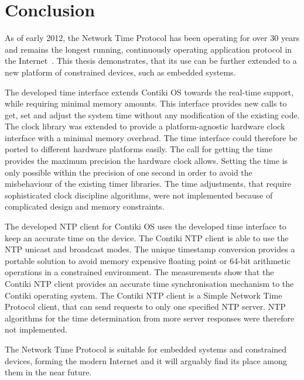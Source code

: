 






\chapter{Conclusion}
As of early 2012, the Network Time Protocol has been operating for over 30 years
and remains the longest running, continuously operating application
protocol in the Internet~\cite{ntp-y2k}.
This thesis demonstrates, that its use can be further extended to a new platform of constrained devices,
such as embedded systems.

The developed time interface extends Contiki OS towards the real-time support,
while requiring minimal memory amounts.
This interface provides new calls to get, set and adjust the system time without any modification
of the existing code.
The clock library was extended to provide a platform-agnostic hardware clock interface
with a minimal memory overhead.
The time interface could therefore be ported to different hardware platforms easily.
The call for getting the time provides the maximum precision the hardware clock allows.
Setting the time is only possible within the precision of one second in order to avoid
the misbehaviour of the existing timer libraries.
The time adjustments, that require sophisticated clock discipline algorithms,
were not implemented because of complicated design and memory constraints.

The developed NTP client for Contiki OS uses the developed time interface to keep an accurate time on the device.
The Contiki NTP client is able to use the NTP unicast and broadcast modes.
The unique timestamp conversion provides a portable solution to avoid
memory expensive floating point or 64-bit arithmetic operations in a constrained environment.
The measurements show that the Contiki NTP client provides an accurate time
synchronisation mechanism to the Contiki operating system.
The Contiki NTP client is a Simple Network Time Protocol client,
that can send requests to only one specified NTP server.
NTP algorithms for the time determination from more server responses were therefore not implemented.

The Network Time Protocol is suitable for embedded systems and constrained devices,
forming the modern Internet and it will arguably find its place among them in the near future.
